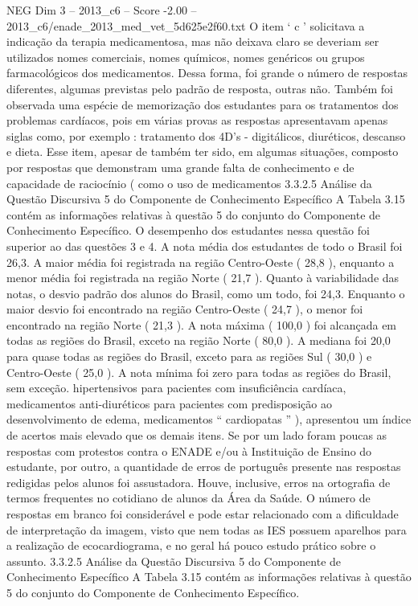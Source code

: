 \begin{textsample}{NEG Dim 3 – 2013\_c6 – Score -2.00 – 2013\_c6/enade\_2013\_med\_vet\_5d625e2f60.txt}
O item ‘ c ’ solicitava a indicação da terapia medicamentosa, mas não deixava claro se deveriam ser utilizados nomes comerciais, nomes químicos, nomes genéricos ou grupos farmacológicos dos medicamentos.
Dessa forma, foi grande o número de respostas diferentes, algumas previstas pelo padrão de resposta, outras não.
Também foi observada uma espécie de memorização dos estudantes para os tratamentos dos problemas cardíacos, pois em várias provas as respostas apresentavam apenas siglas como, por exemplo : tratamento dos 4D’s - digitálicos, diuréticos, descanso e dieta.
Esse item, apesar de também ter sido, em algumas situações, composto por respostas que demonstram uma grande falta de conhecimento e de capacidade de raciocínio ( como o uso de medicamentos 3.3.2.5 Análise da Questão Discursiva 5 do Componente de Conhecimento Específico A Tabela 3.15 contém as informações relativas à questão 5 do conjunto do Componente de Conhecimento Específico.
O desempenho dos estudantes nessa questão foi superior ao das questões 3 e 4.
A nota média dos estudantes de todo o Brasil foi 26,3.
A maior média foi registrada na região Centro-Oeste ( 28,8 ), enquanto a menor média foi registrada na região Norte ( 21,7 ).
Quanto à variabilidade das notas, o desvio padrão dos alunos do Brasil, como um todo, foi 24,3.
Enquanto o maior desvio foi encontrado na região Centro-Oeste ( 24,7 ), o menor foi encontrado na região Norte ( 21,3 ).
A nota máxima ( 100,0 ) foi alcançada em todas as regiões do Brasil, exceto na região Norte ( 80,0 ).
A mediana foi 20,0 para quase todas as regiões do Brasil, exceto para as regiões Sul ( 30,0 ) e Centro-Oeste ( 25,0 ).
A nota mínima foi zero para todas as regiões do Brasil, sem exceção. hipertensivos para pacientes com insuficiência cardíaca, medicamentos anti-diuréticos para pacientes com predisposição ao desenvolvimento de edema, medicamentos “ cardiopatas ” ), apresentou um índice de acertos mais elevado que os demais itens.
Se por um lado foram poucas as respostas com protestos contra o ENADE e/ou à Instituição de Ensino do estudante, por outro, a quantidade de erros de português presente nas respostas redigidas pelos alunos foi assustadora.
Houve, inclusive, erros na ortografia de termos frequentes no cotidiano de alunos da Área da Saúde.
O número de respostas em branco foi considerável e pode estar relacionado com a dificuldade de interpretação da imagem, visto que nem todas as IES possuem aparelhos para a realização de ecocardiograma, e no geral há pouco estudo prático sobre o assunto. 3.3.2.5 Análise da Questão Discursiva 5 do Componente de Conhecimento Específico A Tabela 3.15 contém as informações relativas à questão 5 do conjunto do Componente de Conhecimento Específico.

\end{textsample}

